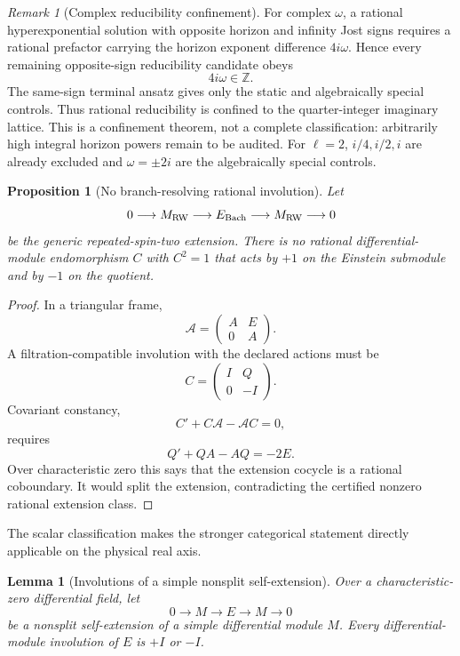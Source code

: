 \documentclass[11pt]{article}
\newtheorem{proposition}[theorem]{Proposition}
\newtheorem{lemma}[theorem]{Lemma}
\theoremstyle{definition}
\theoremstyle{remark}
\newtheorem{remark}[theorem]{Remark}
\begin{document}
\begin{remark}[Complex reducibility confinement]
For complex \(\omega\), a rational hyperexponential solution with opposite
horizon and infinity Jost signs requires a rational prefactor carrying the
horizon exponent difference \(4i\omega\).  Hence every remaining
opposite-sign reducibility candidate obeys
\[
4i\omega\in\mathbb Z.
\]
The same-sign terminal ansatz gives only the static and algebraically special
controls.  Thus rational reducibility is confined to the quarter-integer
imaginary lattice.  This is a confinement theorem, not a complete
classification: arbitrarily high integral horizon powers remain to be
audited.  For \(\ell=2\), \(i/4,i/2,i\) are already excluded and
\(\omega=\pm2i\) are the algebraically special controls.
\end{remark}

\begin{proposition}[No branch-resolving rational involution]
\label{prop:no-local-c}
Let
\[
0\longrightarrow M_{\rm RW}
\longrightarrow E_{\rm Bach}
\longrightarrow M_{\rm RW}
\longrightarrow0
\]
be the generic repeated-spin-two extension.  There is no rational
differential-module endomorphism \(C\) with \(C^2=1\) that acts by \(+1\) on
the Einstein submodule and by \(-1\) on the quotient.
\end{proposition}

\begin{proof}
In a triangular frame,
\[
\mathcal A=\begin{pmatrix}A&E\\0&A\end{pmatrix}.
\]
A filtration-compatible involution with the declared actions must be
\[
C=\begin{pmatrix}I&Q\\0&-I\end{pmatrix}.
\]
Covariant constancy,
\[
C'+C\mathcal A-\mathcal AC=0,
\]
requires
\[
Q'+QA-AQ=-2E.
\]
Over characteristic zero this says that the extension cocycle is a rational
coboundary.  It would split the extension, contradicting the certified
nonzero rational extension class.
\end{proof}

The scalar classification makes the stronger categorical statement directly
applicable on the physical real axis.

\begin{lemma}[Involutions of a simple nonsplit self-extension]
\label{lem:simple-extension-involution}
Over a characteristic-zero differential field, let
\[
0\longrightarrow M\longrightarrow E\longrightarrow M\longrightarrow0
\]
be a nonsplit self-extension of a simple differential module \(M\).  Every
differential-module involution of \(E\) is \(+I\) or \(-I\).
\end{lemma}
\end{document}
